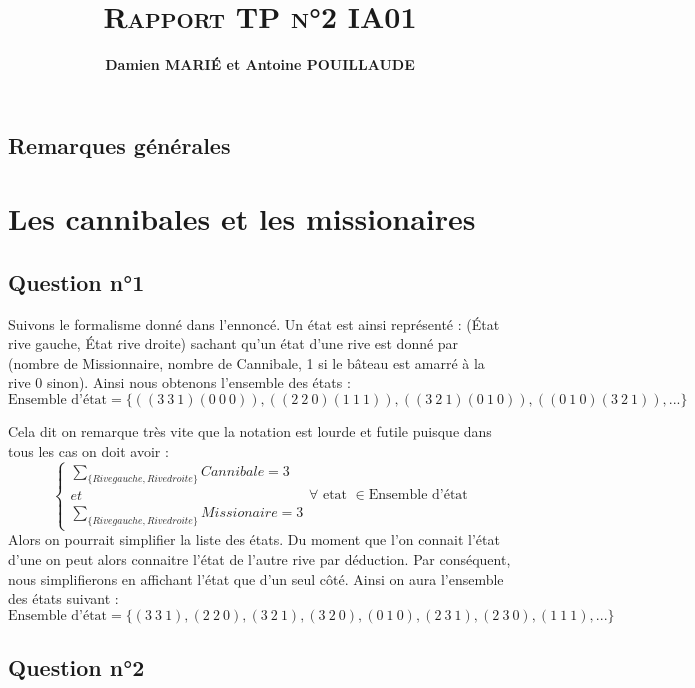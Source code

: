 \documentclass[a4paper, 12pt, leqno]{report}
\title{\textsc{\textbf{Rapport TP n°2 IA01}}}
\author{\textbf{Damien MARI\'E et Antoine POUILLAUDE}}
\theoremstyle{plain}
\begin{document}
    \maketitle
    \tableofcontents
\newpage
\section*{Remarques générales}

      								
    \chapter{Les cannibales et les missionaires}		
        \section{Question n°1}        
            Suivons le formalisme donné dans l'ennoncé. Un état est ainsi représenté : (État rive gauche, État rive droite) sachant qu'un état d'une rive est donné par (nombre de Missionnaire, nombre de Cannibale, 1 si le bâteau est amarré à la rive 0 sinon). Ainsi nous obtenons l'ensemble des états : 
            \[ \text{Ensemble d'état} = 
            \{ ((3\ 3\ 1) (0\ 0\ 0)),
            ((2\ 2\ 0) (1\ 1\ 1)),
            ((3\ 2\ 1) (0\ 1\ 0)),
            ((0\ 1\ 0) (3\ 2\ 1)),
            ...
            \}\]
            
    Cela dit on remarque très vite que la notation est lourde et futile puisque dans tous les cas on doit avoir : 
\[
          \left\{
    \begin{array}{ll}
        \sum_{\{Rive gauche,Rive droite\}}^{}Cannibale =3\\
        et\\
        \sum_{\{Rive gauche,Rive droite\}}^{}Missionaire = 3
    \end{array}
\right.
\forall \text{ etat } \in \text{Ensemble d'état}
\]
Alors on pourrait simplifier la liste des états. Du moment que l'on connait l'état d'une on peut alors connaitre l'état de l'autre rive par déduction. Par conséquent, nous simplifierons en affichant l'état que d'un seul côté. Ainsi on aura l'ensemble des états suivant :
\[ \text{Ensemble d'état} = 
            \{ (3\ 3\ 1),
            (2\ 2\ 0),
            (3\ 2\ 1),
            (3\ 2\ 0),
            (0\ 1\ 0),
            (2\ 3\ 1),
            (2\ 3\ 0),
            (1\ 1\ 1),
            ...
            \}\]

		\section{Question n°2}     
            
\end{document}
